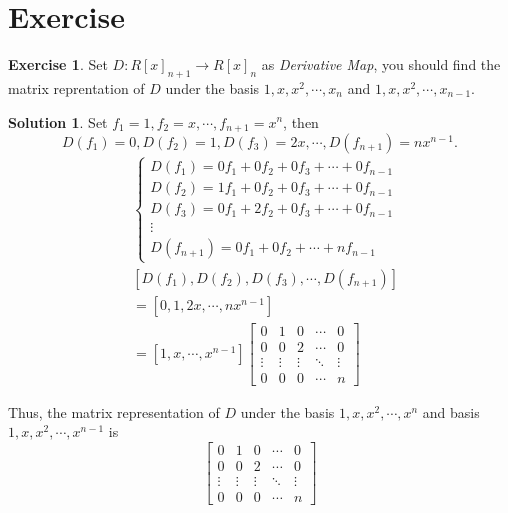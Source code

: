 \documentclass{article}
\theoremstyle{definition}
\newtheorem{exe}{Exercise}[section]
\newtheorem{sol}{Solution}[exe]
\begin{document}
\section{Exercise}
\begin{exe}
    Set $D:R[x]_{n+1}\rightarrow R[x]_{n}$ as \textit{Derivative Map}, you 
    should find the matrix reprentation of $D$ under the basis 
    $1,x,x^{2},\cdots,x_{n}$ and $1,x,x^{2},\cdots,x_{n-1}$.
\end{exe}
\begin{sol}
    Set $f_{1}=1,f_{2}=x,\cdots,f_{n+1}=x^{n}$,
    then $$D(f_{1})=0,D(f_{2})=1,D(f_{3})=2x,\cdots,D(f_{n+1})=nx^{n-1}.$$
    \begin{align*}
        &\begin{cases}
            D(f_{1})=0f_{1}+0f_{2}+0f_{3}+\cdots+0f_{n-1}\\
            D(f_{2})=1f_{1}+0f_{2}+0f_{3}+\cdots+0f_{n-1}\\
            D(f_{3})=0f_{1}+2f_{2}+0f_{3}+\cdots+0f_{n-1}\\
            \vdots\\
            D(f_{n+1})=0f_{1}+0f_{2}+\cdots+nf_{n-1}
        \end{cases}\\
        & [D(f_{1}),D(f_{2}),D(f_{3}),\cdots,D(f_{n+1})] \\
        & = [0,1,2x,\cdots,nx^{n-1}] \\ 
        & = [1,x,\cdots,x^{n-1}]
        \begin{bmatrix}
            0 & 1 & 0 & \cdots & 0\\
            0 & 0 & 2 & \cdots & 0\\
            \vdots & \vdots & \vdots & \ddots & \vdots\\
            0 & 0 & 0 & \cdots & n
        \end{bmatrix}
    \end{align*}

    Thus, the matrix representation of $D$ under the basis $1,x,x^{2},\cdots,x^{n}$ 
    and basis $1,x,x^{2},\cdots,x^{n-1}$ is
    $$
    \begin{bmatrix}
        0 & 1 & 0 & \cdots & 0\\
        0 & 0 & 2 & \cdots & 0\\
        \vdots & \vdots & \vdots & \ddots & \vdots\\
        0 & 0 & 0 & \cdots & n
    \end{bmatrix}
    $$
\end{sol}
\end{document}
